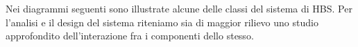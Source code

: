 
Nei diagrammi seguenti sono illustrate alcune delle classi del sistema di HBS.
Per l'analisi e il design del sistema riteniamo sia di maggior rilievo uno studio approfondito dell'interazione fra i componenti dello stesso.
